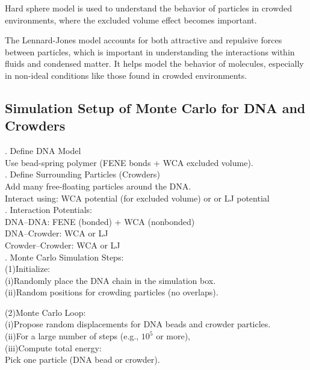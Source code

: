 \documentclass[12pt]{article}
\begin{document}
\begin{flushleft}
Hard sphere model is used to understand the behavior of particles in crowded environments, where the excluded volume effect becomes important. 

The Lennard-Jones model accounts for both attractive and repulsive forces between particles, which is important in understanding the interactions within fluids and condensed matter. It helps model the behavior of molecules, especially in non-ideal conditions like those found in crowded environments. 

\subsection*{Simulation Setup of Monte Carlo for DNA and Crowders}
. Define DNA Model\\
Use bead-spring polymer (FENE bonds + WCA excluded volume).\\
. Define Surrounding Particles (Crowders)\\
Add many free-floating particles around the DNA.\\
Interact using: WCA potential (for excluded volume) or or LJ potential\\

. Interaction Potentials:\\
DNA–DNA: FENE (bonded) + WCA (nonbonded)\\
DNA–Crowder: WCA or LJ\\
Crowder–Crowder: WCA or LJ\\



. Monte Carlo Simulation Steps:\\
(1)Initialize:\\
\setlength{\parindent}{6em} (i)Randomly place the DNA chain in the simulation box.\\
   (ii)Random positions for crowding particles (no overlaps).

\setlength{\parindent}{0em} 

\setlength{\parindent}{4em}(2)Monte Carlo Loop:\\
\setlength{\parindent}{6em}   (i)Propose random displacements for DNA beads and crowder particles.\\

(ii)For a large number of steps (e.g., $10^{5}$ or more),\\
(iii)Compute total energy:\\
\setlength{\parindent}{8em}Pick one particle (DNA bead or crowder).


\end{flushleft}
\end{document}
